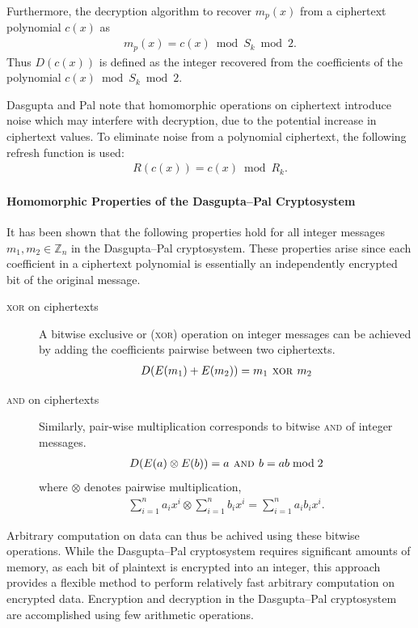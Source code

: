 Furthermore, the decryption algorithm to recover $m_p(x)$ from a ciphertext polynomial $c(x)$ as
\begin{align*}
	m_p(x) = c(x) \bmod S_k \bmod 2.
\end{align*}
Thus $D(c(x))$ is defined as the integer recovered from the coefficients of the polynomial $c(x) \bmod S_k \bmod 2$.

Dasgupta and Pal note that homomorphic operations on ciphertext introduce noise which may interfere with decryption, due to the potential increase in ciphertext values.
To eliminate noise from a polynomial ciphertext, the following refresh function is used:
\begin{align*}
	R(c(x)) = c(x) \bmod R_k.
\end{align*}

\paragraph{Homomorphic Properties of the Dasgupta--Pal Cryptosystem}
It has been shown \cite{dasgupta_design_2016} that the following properties hold for all integer messages $m_1, m_2 \in \mathbb{Z}_n$ in the Dasgupta--Pal cryptosystem. These properties arise since each coefficient in a ciphertext polynomial is essentially an independently encrypted bit of the original message.
\begin{description}
	\item[\textsc{xor} on ciphertexts]
	A bitwise exclusive or (\textsc{xor}) operation on integer messages can be achieved by adding the coefficients pairwise between two ciphertexts.
	\begin{align*}
		D(E(m_1)+E(m_2)) = m_1 \textsc{ xor } m_2
	\end{align*}
	\item[\textsc{and} on ciphertexts]
	Similarly, pair-wise multiplication corresponds to bitwise \textsc{and} of integer messages.
	\begin{align*}
		D(E(a) \otimes E(b)) = a \textsc{ and } b = ab \bmod 2
	\end{align*}
	where $\otimes$ denotes pairwise multiplication,
	\begin{align*}
		\sum_{i=1}^n{a_ix^i} \otimes \sum_{i=1}^n{b_ix^i} = \sum_{i=1}^n{a_ib_ix^i}.
	\end{align*}
\end{description}

Arbitrary computation on data can thus be achived using these bitwise operations. While the Dasgupta--Pal cryptosystem requires significant amounts of memory, as each bit of plaintext is encrypted into an integer, this approach provides a flexible method to perform relatively fast arbitrary computation on encrypted data. Encryption and decryption in the Dasgupta--Pal cryptosystem are accomplished using few arithmetic operations.

